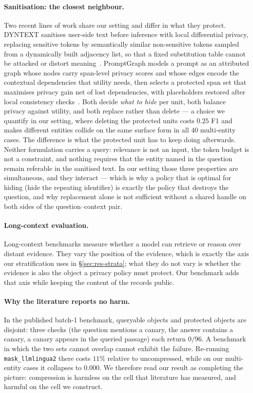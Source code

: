 \documentclass[conference]{IEEEtran}
\newcommand{\arm}[1]{\texttt{#1}}
\begin{document}
\paragraph{Sanitisation: the closest neighbour.}
Two recent lines of work share our setting and differ in what they protect. DYNTEXT
sanitises user-side text before inference with local differential privacy, replacing sensitive
tokens by semantically similar non-sensitive tokens sampled from a dynamically built adjacency
list, so that a fixed substitution table cannot be attacked or distort meaning~\cite{dyntext}.
PromptGraph models a prompt as an attributed graph whose nodes carry span-level privacy scores
and whose edges encode the contextual dependencies that utility needs, then selects a protected
span set that maximises privacy gain net of lost dependencies, with placeholders restored after
local consistency checks~\cite{promptgraph}. Both decide \emph{what to hide} per unit, both
balance privacy against utility, and both replace rather than delete --- a choice we quantify
in our setting, where deleting the protected units costs $0.25$ F1 and makes different entities
collide on the same surface form in all $40$ multi-entity cases. The difference is what the
protected unit has to keep doing afterwards. Neither formulation
carries a query: relevance is not an input, the token budget is not a constraint, and nothing
requires that the entity named in the question remain referable in the sanitised text. In our
setting those three properties are simultaneous, and they interact --- which is why a policy
that is optimal for hiding (hide the repeating identifier) is exactly the policy that destroys
the question, and why replacement alone is not sufficient without a shared handle on both sides
of the question--context pair.

\paragraph{Long-context evaluation.}
Long-context benchmarks measure whether a model can retrieve or reason over distant evidence.
They vary the position of the evidence, which is exactly the axis our stratification uses in
\S\ref{sec:res-strata}; what they do not vary is whether the evidence is also the object a
privacy policy must protect. Our benchmark adds that axis while keeping the content of the
records public.

\paragraph{Why the literature reports no harm.}
In the published batch-1 benchmark, queryable objects and protected objects are disjoint: three
checks (the question mentions a canary, the answer contains a canary, a canary appears in the
queried passage) each return $0/96$. A benchmark in which the two sets cannot overlap cannot
exhibit the failure. Re-running \arm{mask\_llmlingua2} there costs $11\%$ relative to
uncompressed, while on our multi-entity cases it collapses to $0.000$. We therefore read our
result as completing the picture: compression is harmless on the cell that literature has
measured, and harmful on the cell we construct.
\end{document}
